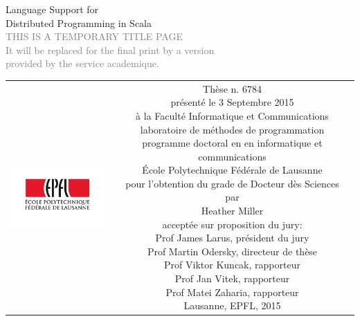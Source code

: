 \begin{titlepage}
\begin{center}
\sffamily


\null\vspace{2cm}
{\huge Language Support for \\[12pt] Distributed Programming in Scala} \\[24pt]
\textcolor{gray}{\small{THIS IS A TEMPORARY TITLE PAGE \\ It will be replaced for the final print by a version \\ provided by the service academique.}}

\vfill

\begin{tabular} {cc}
\parbox{0.3\textwidth}{\includegraphics[width=4cm]{images/epfl}}
&
\parbox{0.7\textwidth}{%
	Thèse n. 6784\\
	présenté le 3 Septembre 2015\\
	à la Faculté Informatique et Communications\\
	laboratoire de méthodes de programmation\\
	programme doctoral en en informatique et communications\\
%
	École Polytechnique Fédérale de Lausanne\\[6pt]
	pour l'obtention du grade de Docteur dès Sciences\\
	par\\ [4pt]
	\null \hspace{3em} Heather Miller\\[9pt]
%
\small
acceptée sur proposition du jury:\\[4pt]
%
    Prof James Larus, président du jury\\
    Prof Martin Odersky, directeur de thèse\\
    Prof Viktor Kuncak, rapporteur\\
    Prof Jan Vitek, rapporteur\\
    Prof Matei Zaharia, rapporteur\\[12pt]
%
Lausanne, EPFL, 2015}
\end{tabular}
\end{center}
\vspace{2cm}
\end{titlepage}
